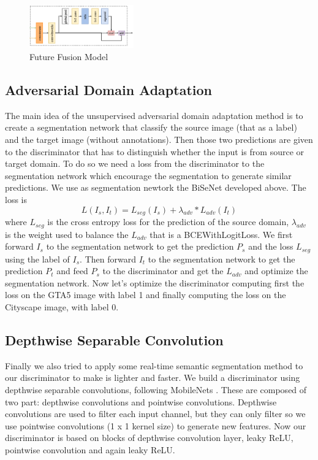 \documentclass[conference]{IEEEtran}
\begin{document}
\begin{figure}[tp]
\centerline{\includegraphics[width=0.4\textwidth]{figures/FFM}}
\caption{Future Fusion Model}
\label{fig:ffm}
\end{figure}

\subsection{Adversarial Domain Adaptation}

The main idea of the unsupervised adversarial domain adaptation method \cite{b3} is to create a segmentation network that classify the source
image (that as a label) and the target image (without annotations). Then those two predictions are given to the discriminator that
has to distinguish whether the input is from source or target domain. To do so we need a loss from the discriminator to the 
segmentation network which encourage the segmentation to generate similar predictions. We use as segmentation newtork the BiSeNet
developed above. The loss is 
\[L(I_s,I_t) = L_{seg}(I_s) + \lambda_{adv}*L_{adv}(I_t)\]
where \(L_{seg}\) is the cross entropy loss for the prediction of the source domain, \(\lambda_{adv}\) is the weight used to 
balance the \(L_{adv}\) that is a BCEWithLogitLoss.
We first forward \(I_s\) to the segmentation network to get the prediction \(P_s\) and the loss \(L_{seg}\) using the label of \(I_s\).
Then forward \(I_t\) to the segmentation network to get the prediction \(P_t\) and feed \(P_s\) to the discriminator and get the
\(L_{adv}\) and optimize the segmentation network. Now let's optimize the discriminator computing first the loss on the GTA5 image
with label 1 and finally computing the loss on the Cityscape image, with label 0. 

\subsection{Depthwise Separable Convolution}

Finally we also tried to apply some real-time semantic segmentation method to our discriminator to make is lighter and faster.
We build a discriminator using depthwise separable convolutions, following MobileNets \cite{b6}. These are composed of two part: 
depthwise convolutions and pointwise convolutions. Depthwise convolutions are used to filter each input channel, but they can
only filter so we use pointwise convolutions (1 x 1 kernel size) to generate new features. Now our discriminator is based on blocks of
depthwise convolution layer, leaky ReLU, pointwise convolution and again leaky ReLU.
\end{document}
